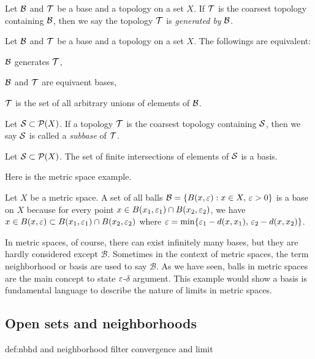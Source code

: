 \begin{defn}
Let $\mathcal{B}$ and $\mathcal{T}$ be a base and a topology on a set $X$.
If $\mathcal{T}$ is the coarsest topology containing $\mathcal{B}$, then we say the topology $\mathcal{T}$ is \emph{generated by} $\mathcal{B}$.
\end{defn}
\begin{thm}
Let $\mathcal{B}$ and $\mathcal{T}$ be a base and a topology on a set $X$.
The followings are equivalent:
\begin{cond}
\item $\mathcal{B}$ generates $\mathcal{T}$,
\item $\mathcal{B}$ and $\mathcal{T}$ are equivaent bases,
\item $\mathcal{T}$ is the set of all arbitrary unions of elements of $\mathcal{B}$.
\end{cond}
\end{thm}

\begin{defn}
Let $\mathcal{S}\subset\mathcal{P}(X)$.
If a topology $\mathcal{T}$ is the coarsest topology containing $\mathcal{S}$, then we say $\mathcal{S}$ is called a \emph{subbase} of $\mathcal{T}$.
\end{defn}
\begin{prop}
Let $\mathcal{S}\subset\mathcal{P}(X)$.
The set of finite intersections of elements of $\mathcal{S}$ is a basis.
\end{prop}

Here is the metric space example.
\begin{ex}
Let $X$ be a metric space.
A set of all balls $\mathcal{B}=\{B(x,\varepsilon):x\in X,\,\varepsilon>0\}$ is a base on $X$ because for every point $x\in B(x_1,\varepsilon_1)\cap B(x_2,\varepsilon_2)$, we have $x\in B(x,\varepsilon)\subset B(x_1,\varepsilon_1)\cap B(x_2,\varepsilon_2)$ where $\varepsilon=\min\{\varepsilon_1-d(x,x_1),\,\varepsilon_2-d(x,x_2)\}$.
\end{ex}

In metric spaces, of course, there can exist infinitely many bases, but they are hardly considered except $\mathcal{B}$.
Sometimes in the context of metric spaces, the term neighborhood or basis are used to say $\mathcal{B}$.
As we have seen, balls in metric spaces are the main concept to state $\varepsilon$-$\delta$ argument.
This example would show a basis is fundamental language to describe the nature of limits in metric spaces.










\subsection{Open sets and neighborhoods}
def:nbhd and neighborhood filter
convergence and limit

